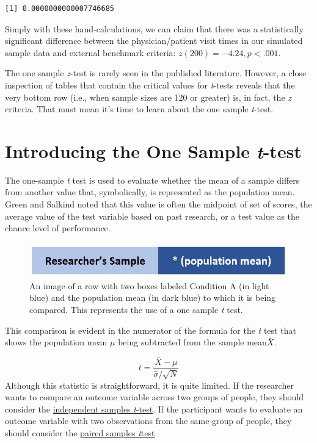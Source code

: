 \documentclass[
  11pt,
]{book}
\begin{document}
\begin{verbatim}
[1] 0.0000000000007746685
\end{verbatim}

Simply with these hand-calculations, we can claim that there was a statistically significant difference between the physician/patient visit times in our simulated sample data and external benchmark criteria: \(z(200) = -4.24, p < .001\).

The one sample \emph{z}-test is rarely seen in the published literature. However, a close inspection of tables that contain the critical values for \emph{t}-tests reveals that the very bottom row (i.e., when sample sizes are 120 or greater) is, in fact, the \emph{z} criteria. That must mean it's time to learn about the one sample \emph{t}-test.

\hypertarget{introducing-the-one-sample-t-test}{%
\section{\texorpdfstring{Introducing the One Sample \emph{t}-test}{Introducing the One Sample t-test}}\label{introducing-the-one-sample-t-test}}

The one-sample \emph{t} test is used to evaluate whether the mean of a sample differs from another value that, symbolically, is represented as the population mean. Green and Salkind \citep{green_using_2014} noted that this value is often the midpoint of set of scores, the average value of the test variable based on past research, or a test value as the chance level of performance.

\begin{figure}
\centering
\includegraphics{images/ttests/onesample.jpg}
\caption{An image of a row with two boxes labeled Condition A (in light blue) and the population mean (in dark blue) to which it is being compared. This represents the use of a one sample \emph{t} test.}
\end{figure}

This comparison is evident in the numerator of the formula for the \emph{t} test that shows the population mean \(\mu\) being subtracted from the sample mean\(\bar{X}\).

\[
t = \frac{\bar{X} - \mu}{\hat{\sigma}/\sqrt{N} }
\]
Although this statistic is straightforward, it is quite limited. If the researcher wants to compare an outcome variable across two groups of people, they should consider the \protect\hyperlink{tIndSample}{independent samples \emph{t}-test}. If the participant wants to evaluate an outcome variable with two observations from the same group of people, they should consider the \protect\hyperlink{tPaired}{paired samples \emph{t}test}
\end{document}
